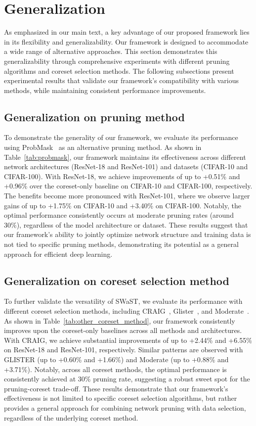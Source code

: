 \section{Generalization}
\label{appendix:using_other_method}
As emphasized in our main text, a key advantage of our proposed framework lies in its flexibility and generalizability. Our framework is designed to accommodate a wide range of alternative approaches. This section demonstrates this generalizability through comprehensive experiments with different pruning algorithms and coreset selection methods. The following subsections present experimental results that validate our framework's compatibility with various methods, while maintaining consistent performance improvements.

\subsection{Generalization on pruning method}
To demonstrate the generality of our framework, we evaluate its performance using ProbMask~\cite{zhou2022probabilistic} as an alternative pruning method. As shown in Table~\ref{tab:probmask}, our framework maintains its effectiveness across different network architectures (ResNet-18 and ResNet-101) and datasets (CIFAR-10 and CIFAR-100). With ResNet-18, we achieve improvements of up to +0.51\% and +0.96\% over the coreset-only baseline on CIFAR-10 and CIFAR-100, respectively. The benefits become more pronounced with ResNet-101, where we observe larger gains of up to +1.75\% on CIFAR-10 and +3.40\% on CIFAR-100. Notably, the optimal performance consistently occurs at moderate pruning rates (around 30\%), regardless of the model architecture or dataset. These results suggest that our framework's ability to jointly optimize network structure and training data is not tied to specific pruning methods, demonstrating its potential as a general approach for efficient deep learning.

\subsection{Generalization on coreset selection method}
To further validate the versatility of SWaST, we evaluate its performance with different coreset selection methods, including CRAIG~\cite{mirzasoleiman2020coresets}, Glister~\cite{killamsetty2021glister}, and Moderate~\cite{xia2022moderate}. As shown in Table~\ref{tab:other_coreset_method}, our framework consistently improves upon the coreset-only baselines across all methods and architectures. With CRAIG, we achieve substantial improvements of up to +2.44\% and +6.55\% on ResNet-18 and ResNet-101, respectively. Similar patterns are observed with GLISTER (up to +0.60\% and +1.66\%) and Moderate (up to +0.88\% and +3.71\%). Notably, across all coreset methods, the optimal performance is consistently achieved at 30\% pruning rate, suggesting a robust sweet spot for the pruning-coreset trade-off. These results demonstrate that our framework's effectiveness is not limited to specific coreset selection algorithms, but rather provides a general approach for combining network pruning with data selection, regardless of the underlying coreset method.

